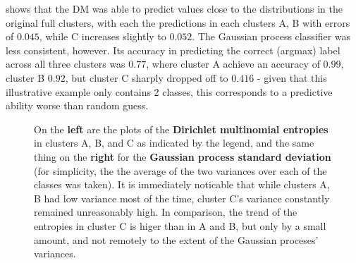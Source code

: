 

 shows that the DM was able to predict values close to the distributions in the original full clusters, with each the predictions in each clusters A, B with errors of $0.045$, while C increases slightly to $0.052$. The Gaussian process classifier was less consistent, however. Its accuracy in predicting the correct (argmax) label across all three clusters was $0.77$, where cluster A achieve an accuracy of $0.99$, cluster B $0.92$, but cluster C sharply dropped off to $0.416$ - given that this illustrative example only contains 2 classes, this corresponds to a predictive ability worse than random guess. 

\begin{figure}
    \caption{On the \textbf{left} are the plots of the \textbf{Dirichlet multinomial entropies} in clusters A, B, and C as indicated by the legend, and the same thing on the \textbf{right} for the \textbf{Gaussian process standard deviation} (for simplicity, the the average of the two variances over each of the classes was taken). It is immediately noticable that while clusters A, B had low variance most of the time, cluster C's variance constantly remained unreasonably high. In comparison, the trend of the entropies in cluster C is higer than in A and B, but only by a small amount, and not remotely to the extent of the Gaussian proceses' variances.}
    \label{fig:dm-entr_vs_gp-vars}
\end{figure}

